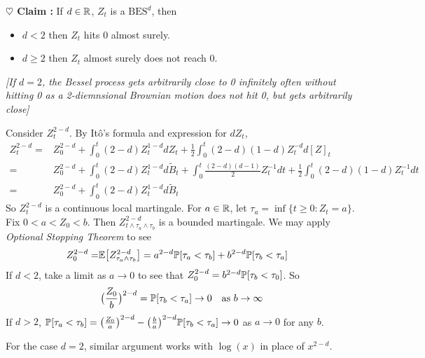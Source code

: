 \documentclass[12pt,a4paper]{article}
\newenvironment{proof}
{\begin{changemargin}{0.5cm}{0.5cm} 
	}%
	{\end{changemargin}
}
\renewenvironment{i}
{\begin{itemize} 
	}%
	{\end{itemize}
}
\newenvironment{p}
{\begin{proof} 
	}%
	{\end{proof}
}
\begin{document}
\textbf{$\heartsuit$ Claim :} If $d\in \mathbb{R}$, $Z_t$ is a $\text{BES}^d$, then
\begin{i}
\item $d<2$ then $Z_t$ hits 0 almost surely.
\item $d\geq 2$ then $Z_t$ almost surely does not reach 0.
\end{i}
\emph{[If $d=2$, the Bessel process gets arbitrarily close to 0 infinitely often without hitting 0 as a 2-diemnsional Brownian motion does not hit 0, but gets arbitrarily close]}
\begin{p}
\pf Consider $Z_t^{2-d}$. By It\^o's formula and expression for $dZ_t$,
\begin{align*}
Z_t^{2-d} =& Z_0^{2-d} + \int_0^t (2-d) Z_t^{1-d} dZ_t + \frac{1}{2} \int_0^t (2-d)(1-d) Z_t^{-d} d[Z]_t \\
=& Z_0^{2-d} + \int_0^t (2-d) Z_t^{1-d} d\tilde{B}_t +\int_0^t \frac{(2-d)(d-1)}{2} Z_t^{-1} dt + \frac{1}{2} \int_0^t (2-d)(1-d) Z_t^{-1} dt \\
=& Z_0^{2-d} + \int_0^t (2-d) Z_t^{1-d} d\tilde{B}_t
\end{align*}
So $Z_t^{2-d}$ is a continuous local martingale. For $a\in \mathbb{R}$, let $\tau_a = \inf \{ t\geq 0: Z_t =a\}$. Fix $0< a< Z_0 <b$. Then $Z^{2-d}_{t\wedge \tau_a \wedge \tau_b}$ is a bounded martingale. We may apply \emph{Optional Stopping Theorem} to see
\begin{align*}
Z_0^{2-d} =& \mathbb{E} \big[ Z_{\tau_a \wedge \tau_b}^{2-d} \big] = a^{2-d} \mathbb{P} [\tau_a < \tau_b] + b^{2-d} \mathbb{P}[\tau_b < \tau_a] 
\end{align*}
If $d<2$, take a limit as $a\rightarrow 0$ to see that $Z_0^{2-d}= b^{2-d} \mathbb{P} [\tau_b < \tau_0]$. So
\begin{align*}
\big( \frac{Z_0}{b} \big)^{2-d} = \mathbb{P} [\tau_b < \tau_a] \rightarrow 0 \quad \text{as } b\rightarrow \infty
\end{align*}
If $d>2$, $\mathbb{P} [\tau_a < \tau_b] = \big( \frac{Z_0}{a} \big)^{2-d} - \big( \frac{b}{a} \big)^{2-d} \mathbb{P} [\tau _b < \tau_a] \rightarrow 0$ as $a\rightarrow 0$ for any $b$.
\s

For the case $d=2$, similar argument works with $\log(x)$ in place of $x^{2-d}$.

\eop
\end{p}
\s
\end{document}

